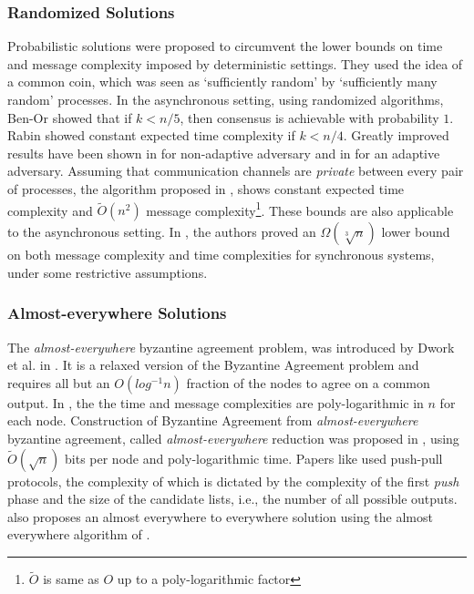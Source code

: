 \subsubsection{Randomized Solutions}
Probabilistic solutions were proposed to circumvent the lower bounds on time and message complexity imposed by deterministic settings. They used the idea of a common coin, which was seen as `sufficiently random' by `sufficiently many random' processes. 
In the asynchronous setting, using randomized algorithms, Ben-Or \cite{Ben-Or83} showed that if $k < n/5$, then consensus is achievable with probability $1$. Rabin \cite{Rabin83} showed constant expected time complexity if $k < n/4$. Greatly improved results have been shown in \cite{PCR14, KKKSS08, MHR14} for non-adaptive adversary and in \cite{KS13,AAKS14} for an adaptive adversary. Assuming that communication channels are \textit{private} between every pair of processes, the algorithm proposed in \cite{PR10}, shows constant expected time complexity and $\tilde{O}(n^2)$ message complexity\footnote{$\tilde{O}$ is same as $O$ up to a poly-logarithmic factor}. These bounds are also applicable to the asynchronous setting. In \cite{HKK08}, the authors proved an $\Omega(\sqrt[3]{n})$ lower bound on both message complexity and time complexities for synchronous systems, under some restrictive assumptions.

\subsubsection{Almost-everywhere Solutions}
The \textit{almost-everywhere} byzantine agreement problem, was introduced by Dwork et al. in \cite{DPPU88}. It is a relaxed version of the Byzantine Agreement problem and requires all but an $O(log^{-1}n)$ fraction of the nodes to agree on a common output. In \cite{KSSV06}, the the time and message complexities are poly-logarithmic in $n$ for each node. Construction of Byzantine Agreement from \textit{almost-everywhere} byzantine agreement, called \textit{almost-everywhere} reduction was proposed in \cite{KS09,KLST11}, using $\tilde{O}(\sqrt{n})$ bits per node and poly-logarithmic time. 
Papers like \cite{KLST11} used push-pull protocols, the complexity of which is dictated by the complexity of the first \textit{push} phase and the size of the candidate lists, i.e., the number of all possible outputs. \cite{BGH13}  also proposes an almost everywhere to everywhere solution using the almost everywhere algorithm of \cite{KSSV06}.


